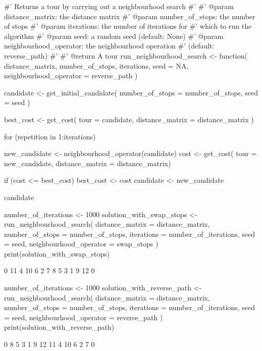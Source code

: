 \begin{Rin}
#' Returns a tour by carrying out a neighbourhood search
#'
#' @param distance_matrix: the distance matrix
#' @param number_of_stops: the number of stops
#' @param iterations: the number of iterations for
#'                    which to run the algorithm
#' @param seed: a random seed (default: None)
#' @param neighbourhood_operator: the neighbourhood operation
#'                                (default: reverse_path)
#'
#' @return A tour
run_neighbourhood_search <- function(
  distance_matrix,
  number_of_stops,
  iterations,
  seed = NA,
  neighbourhood_operator = reverse_path
){
  candidate <- get_initial_candidate(
    number_of_stops = number_of_stops,
    seed = seed
    )

  best_cost <- get_cost(
    tour = candidate,
    distance_matrix = distance_matrix
    )

  for (repetition in 1:iterations) {
    new_candidate <- neighbourhood_operator(candidate)
    cost <- get_cost(
        tour = new_candidate,
        distance_matrix = distance_matrix)

    if (cost <= best_cost) {
      best_cost <- cost
      candidate <- new_candidate
    }

  }
  candidate
}
\end{Rin}

\begin{Rin}
number_of_iterations <- 1000
solution_with_swap_stops <- run_neighbourhood_search(
    distance_matrix = distance_matrix,
    number_of_stops = number_of_stops,
    iterations = number_of_iterations,
    seed = seed,
    neighbourhood_operator = swap_stops
)
print(solution_with_swap_stops)
\end{Rin}

\begin{Rout}
 [1]  0 11  4 10  6  2  7  8  5  3  1  9 12  0
\end{Rout}

\begin{Rin}
number_of_iterations <- 1000
solution_with_reverse_path <- run_neighbourhood_search(
    distance_matrix = distance_matrix,
    number_of_stops = number_of_stops,
    iterations = number_of_iterations,
    seed = seed,
    neighbourhood_operator = reverse_path
)
print(solution_with_reverse_path)
\end{Rin}

\begin{Rout}
 [1]  0  8  5  3  1  9 12 11  4 10  6  2  7  0
\end{Rout}

